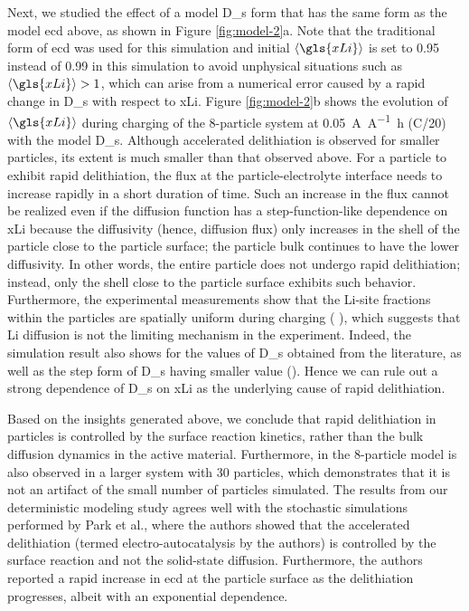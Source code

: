 \documentclass{article}
\begin{document}
Next, we studied the effect of a model \gls{D_s} form that has the
same form as the model \gls{ecd} above, as shown in Figure
\ref{fig:model-2}a. Note that the traditional form of \gls{ecd} was
used for this simulation and initial $\left\langle \gls{xLi}
\right\rangle$ is set to \num{0.95} instead of \num{0.99} in this
simulation to avoid unphysical situations such as $\left\langle
\gls{xLi} \right\rangle > 1$, which can arise from a numerical error
caused by a rapid change in \gls{D_s} with respect to
\gls{xLi}. Figure \ref{fig:model-2}b shows the evolution of
$\left\langle \gls{xLi} \right\rangle$ during charging of the
8-particle system at \SI{0.05}{\ampere\per\ampere\hour} (C/20) with
the model \gls{D_s}. Although accelerated delithiation is observed for
smaller particles, its extent is much smaller than that observed
above. For a particle to exhibit rapid delithiation, the flux at the
particle-electrolyte interface needs to increase rapidly in a short
duration of time. Such an increase in the flux cannot be realized even
if the diffusion function has a step-function-like dependence on
\gls{xLi} because the diffusivity (hence, diffusion flux) only
increases in the shell of the particle close to the particle surface;
the particle bulk continues to have the lower diffusivity. In other
words, the entire particle does not undergo rapid delithiation;
instead, only the shell close to the particle surface exhibits such
behavior. Furthermore, the experimental measurements show that the
Li-site fractions within the particles are spatially uniform during
charging ( ), which
suggests that Li diffusion is not the limiting mechanism in the
experiment. Indeed, the simulation result also shows  for
the values of \gls{D_s} obtained from the literature, as well as the
step form of \gls{D_s} having  smaller value (). Hence we can rule out a strong
dependence of \gls{D_s} on \gls{xLi} as the underlying cause of rapid
delithiation.

Based on the insights generated above, we conclude that rapid
delithiation in \nca{} particles is controlled by the surface reaction
kinetics, rather than the bulk  diffusion dynamics in the
active material. Furthermore,  in the 8-particle model is also observed in a larger
system with 30 particles, which demonstrates that it is not an
artifact of the small number of particles simulated. The results from
our deterministic modeling study agrees well with the stochastic
simulations performed by Park et al.\cite{chueh2021}, where the
authors showed that the accelerated delithiation (termed
electro-autocatalysis by the authors) is controlled by the surface
reaction and not the solid-state diffusion. Furthermore, the authors
reported a rapid increase in \gls{ecd} at the \nca{} particle surface
as the delithiation progresses, albeit with an exponential dependence.
\end{document}
